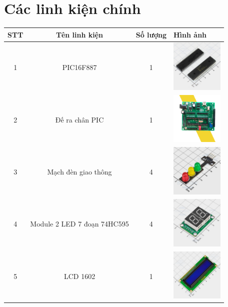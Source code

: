 \section{Các linh kiện chính}
\renewcommand{\arraystretch}{1.5} %
\begin{center}
\begin{tabular}{|c|c|c|>{\centering\arraybackslash}m{3cm}|}
    \hline
    \textbf{STT} & \textbf{Tên linh kiện} & \textbf{Số lượng} & \textbf{Hình ảnh} \\
    \hline
    1 & PIC16F887 & 1 & \includegraphics[width=2.5cm]{pictures/pic16f887.png} \\
    \hline
    2 & Đế ra chân PIC & 1 & \includegraphics[width=2.5cm]{pictures/kitpic.png} \\
    \hline
    3 & Mạch đèn giao thông & 4 & \includegraphics[width=2.5cm]{pictures/traficlight.png} \\
    \hline
    4 & Module 2 LED 7 đoạn 74HC595  & 4 & \includegraphics[width=2.5cm]{pictures/7led.png} \\
    \hline
    5 & LCD 1602 & 1 & \includegraphics[width=2.5cm]{pictures/lcd.png} \\

\end{tabular}
\end{center}
